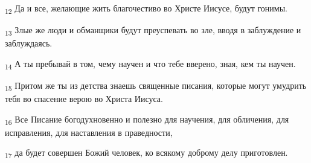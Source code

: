 \begin{tcolorbox}
\textsubscript{12} Да и все, желающие жить благочестиво во Христе Иисусе, будут гонимы.
\end{tcolorbox}
\begin{tcolorbox}
\textsubscript{13} Злые же люди и обманщики будут преуспевать во зле, вводя в заблуждение и заблуждаясь.
\end{tcolorbox}
\begin{tcolorbox}
\textsubscript{14} А ты пребывай в том, чему научен и что тебе вверено, зная, кем ты научен.
\end{tcolorbox}
\begin{tcolorbox}
\textsubscript{15} Притом же ты из детства знаешь священные писания, которые могут умудрить тебя во спасение верою во Христа Иисуса.
\end{tcolorbox}
\begin{tcolorbox}
\textsubscript{16} Все Писание богодухновенно и полезно для научения, для обличения, для исправления, для наставления в праведности,
\end{tcolorbox}
\begin{tcolorbox}
\textsubscript{17} да будет совершен Божий человек, ко всякому доброму делу приготовлен.
\end{tcolorbox}

